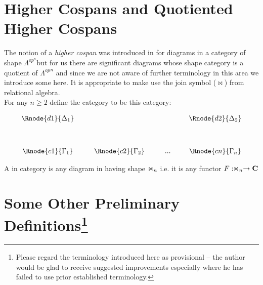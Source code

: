\documentclass[10pt,a4paper]{scrartcl}
\begin{document}
\section{Higher Cospans and Quotiented Higher Cospans}
The notion of a \textit{higher cospan} was
 introduced in \cite{Grandis2007} for diagrams
in a category of shape $\Lambda^{op^n}$but for us there are significant diagrams whose 
shape category is a quotient of  ${\Lambda^{op}}^n$ and since we are not aware
of further terminology in this area we introduce some here. It is appropriate to make use the join symbol ($\Join$) from relational algebra. \\

\noindent For any $n \geq 2$ define the category \ndidly to be this category:

\begin{center}
\begin{displaymath}
\begin{array}{cp{0.3cm}c         p{0.3cm}  c p{0.2cm} c}
\Rnode{d1}{\Delta_1}& &               & &     & &\Rnode{d2}{\Delta_2}  \\ [1.2cm]
\Rnode{c1}{\Gamma_1}& &\Rnode{c2}{\Gamma_2}& & ... & &\Rnode{cn}{\Gamma_n}
\end{array}
\end{displaymath}
\end{center}

\begin{definition}
A \textit{\ndidlycospan}
 in category   is any diagram in  having 
shape $\Join_n$  i.e. it is any functor $F: \Join_n \rightarrow \textbf{C}$
\end{definition}

\section{ Some Other Preliminary Definitions\protect\footnote{Please regard the terminology introduced here as provisional -- the author would be glad to receive suggested improvements especially where he has failed to use prior established terminology.}}
\end{document}
